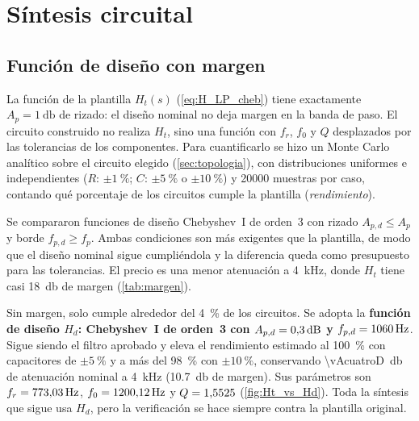 \section{Síntesis circuital}
\label{sec:sintesis}

\subsection{Función de diseño con margen}
\label{sec:margen}
La función de la plantilla $H_t(s)$ (\cref{eq:H_LP_cheb}) tiene exactamente $A_p = \qty{1}{\decibel}$ de rizado: el diseño nominal no deja margen
en la banda de paso. El circuito construido no realiza $H_t$, sino una función con $f_r$, $f_0$ y $Q$ desplazados por las tolerancias de los
componentes. Para cuantificarlo se hizo un Monte Carlo analítico sobre el circuito elegido (\cref{sec:topologia}), con distribuciones uniformes e
independientes ($R$: $\pm\qty{1}{\percent}$; $C$: $\pm\qty{5}{\percent}$ o $\pm\qty{10}{\percent}$) y \num{20000} muestras por caso, contando qué
porcentaje de los circuitos cumple la plantilla (\emph{rendimiento}).

Se compararon funciones de diseño Chebyshev~I de orden~3 con rizado $A_{p,d} \le A_p$ y borde $f_{p,d} \ge f_p$. Ambas condiciones son más
exigentes que la plantilla, de modo que el diseño nominal sigue cumpliéndola y la diferencia queda como presupuesto para las tolerancias. El precio es
una menor atenuación a \qty{4}{\kilo\hertz}, donde $H_t$ tiene casi \qty{18}{\decibel} de margen (\cref{tab:margen}).

\begin{table}[H]
  \centering\small
  \caption{Rendimiento estimado según la función de diseño (Chebyshev~I, orden~3). En negrita, la opción adoptada.}
  \label{tab:margen}
\end{table}

Sin margen, solo cumple alrededor del \qty{4}{\percent} de los circuitos. Se adopta la \textbf{función de diseño $H_d$: Chebyshev~I de orden~3 con
$A_{p,d} = \qty{\vApD}{\decibel}$ y $f_{p,d} = \qty{1060}{\hertz}$}. Sigue siendo el filtro aprobado y eleva el rendimiento estimado al
\qty{100}{\percent} con capacitores de $\pm\qty{5}{\percent}$ y a más del \qty{98}{\percent} con $\pm\qty{10}{\percent}$, conservando
\qty{\vAcuatroD}{\decibel} de atenuación nominal a \qty{4}{\kilo\hertz} (\qty{10.7}{\decibel} de margen). Sus parámetros son
$f_r = \qty{773.03}{\hertz}$, $f_0 = \qty{1200.12}{\hertz}$ y $Q = \num{1.5525}$ (\cref{fig:Ht_vs_Hd}). Toda la síntesis que sigue usa $H_d$, pero la
verificación se hace siempre contra la plantilla original.

